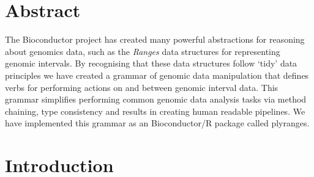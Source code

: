 \documentclass[10pt,letterpaper]{article}
\date{}
\newcommand{\getIndex}[2]{
  \ForEach{,}{\IfEq{#1}{\thislevelitem}{\number\thislevelcount\ExitForEach}{}}{#2}
}
\newcommand{\getAff}[1]{
  \getIndex{#1}{Monash University,Genentech}
}
\begin{document}
\vspace*{0.2in}

\section*{Abstract}
The Bioconductor project has created many powerful abstractions for
reasoning about genomics data, such as the \emph{Ranges} data structures
for representing genomic intervals. By recognising that these data
structures follow `tidy' data principles we have created a grammar of
genomic data manipulation that defines verbs for performing actions on
and between genomic interval data. This grammar simplifies performing
common genomic data analysis tasks via method chaining, type consistency
and results in creating human readable pipelines. We have implemented
this grammar as an Bioconductor/R package called plyranges.


\linenumbers

\hypertarget{introduction}{%
\section{Introduction}\label{introduction}}
\end{document}
